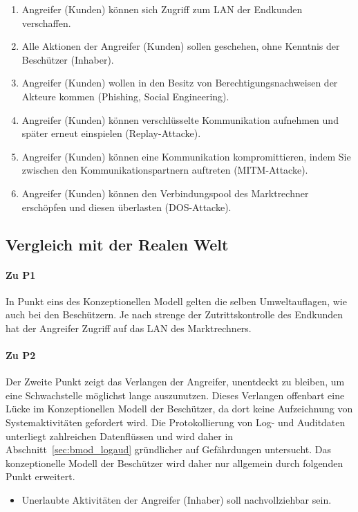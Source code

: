\documentclass[11pt,a4paper]{report}
\begin{document}
\begin{enumerate}[leftmargin=*]
\item Angreifer (Kunden) können sich Zugriff zum LAN der Endkunden verschaffen.
\item Alle Aktionen der Angreifer (Kunden) sollen geschehen, ohne Kenntnis der Beschützer (Inhaber).
\item Angreifer (Kunden) wollen in den Besitz von Berechtigungsnachweisen der Akteure kommen (Phishing, Social Engineering).
\item Angreifer (Kunden) können verschlüsselte Kommunikation aufnehmen und später erneut einspielen (Replay-Attacke).
\item Angreifer (Kunden) können eine Kommunikation kompromittieren, indem Sie zwischen den Kommunikationspartnern auftreten (MITM-Attacke).
\item Angreifer (Kunden) können den Verbindungspool des Marktrechner erschöpfen und diesen überlasten (DOS-Attacke).
\end{enumerate}

\subsection{Vergleich mit der Realen Welt}

\paragraph{Zu P1} In Punkt eins des Konzeptionellen Modell gelten die selben Umweltauflagen, wie auch bei den Beschützern. Je nach strenge der Zutrittskontrolle des Endkunden hat der Angreifer Zugriff auf das LAN des Marktrechners.

\paragraph{Zu P2} Der Zweite Punkt zeigt das Verlangen der Angreifer, unentdeckt zu bleiben, um eine Schwachstelle möglichst lange auszunutzen. Dieses Verlangen offenbart eine Lücke im Konzeptionellen Modell der Beschützer, da dort keine Aufzeichnung von Systemaktivitäten gefordert wird. Die Protokollierung von Log- und Auditdaten unterliegt zahlreichen Datenflüssen und wird daher in Abschnitt~\ref{sec:bmod_logaud} gründlicher auf Gefährdungen untersucht. Das konzeptionelle Modell der Beschützer wird daher nur allgemein durch folgenden Punkt erweitert.

\begin{itemize}[leftmargin=*]
\item Unerlaubte Aktivitäten der Angreifer (Inhaber) soll nachvollziehbar sein.
\end{itemize}
\end{document}
